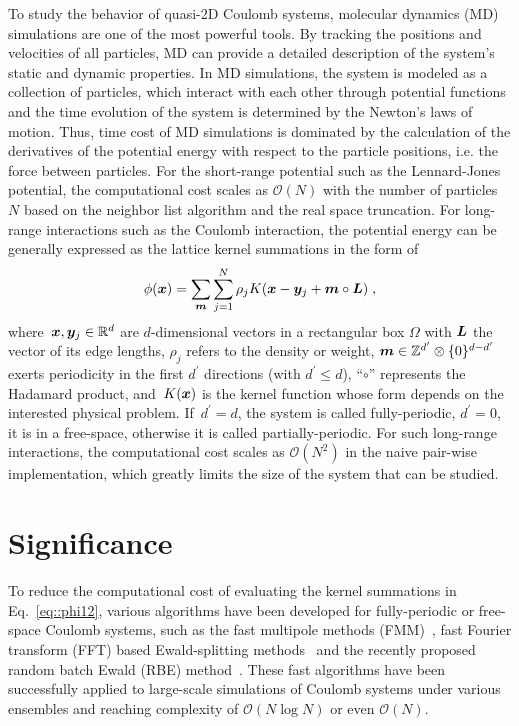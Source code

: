 To study the behavior of quasi-2D Coulomb systems, molecular dynamics (MD) simulations are one of the most powerful tools.
By tracking the positions and velocities of all particles, MD can provide a detailed description of the system's static and dynamic properties.
In MD simulations, the system is modeled as a collection of particles, which interact with each other through potential functions and the time evolution of the system is determined by the Newton's laws of motion.
Thus, time cost of MD simulations is dominated by the calculation of the derivatives of the potential energy with respect to the particle positions, i.e. the force between particles.
For the short-range potential such as the Lennard-Jones potential, the computational cost scales as $\mathcal O(N)$ with the number of particles $N$ based on the neighbor list algorithm and the real space truncation.
For long-range interactions such as the Coulomb interaction, the potential energy can be generally expressed as the lattice kernel summations in the form of
\begin{equation}\label{eq::phi12}
	\phi(\boldsymbol{x}) = \sum_{\boldsymbol{m}} \sum_{j = 1}^{N} \rho_j K(\boldsymbol{x} - \boldsymbol{y}_j + \boldsymbol{m} \circ \boldsymbol{L})\;,
\end{equation}
where~$\boldsymbol{x}, \boldsymbol{y}_j \in \mathbb{R}^d$ are $d$-dimensional vectors in a rectangular box $\Omega$ with $\boldsymbol{L}$ the vector of its edge lengths, $\rho_j$ refers to the density or weight, $\boldsymbol{m} \in \mathbb{Z}^{d^\prime} \otimes \{0\}^{d-d^\prime}$ exerts periodicity in the first $d^{\prime}$ directions (with $d^{\prime}\leq d$), ``$\circ$'' represents the Hadamard product, and~$K(\boldsymbol{x})$ is the kernel function whose form depends on the interested physical problem. 
If~$d^\prime = d$, the system is called fully-periodic, $d^\prime=0$, it is in a free-space, otherwise it is called partially-periodic. 
For such long-range interactions, the computational cost scales as $\mathcal O(N^2)$ in the naive pair-wise implementation, which greatly limits the size of the system that can be studied.


\section{Significance}

To reduce the computational cost of evaluating the kernel summations in Eq.~\eqref{eq::phi12}, various algorithms have been developed for fully-periodic or free-space Coulomb systems, such as the fast multipole methods (FMM)~\cite{greengard1987fast,cheng1999fast,ying2004kernel}, fast Fourier transform (FFT) based Ewald-splitting methods~\cite{hockney2021computer,darden1993particle,essmann1995smooth} and the recently proposed random batch Ewald (RBE) method~\cite{jin2021random, liang2022superscalability,liang2024JCP}.
These fast algorithms have been successfully applied to large-scale simulations of Coulomb systems under various ensembles and reaching complexity of $\mathcal O(N\log N)$ or even $\mathcal O(N)$.

